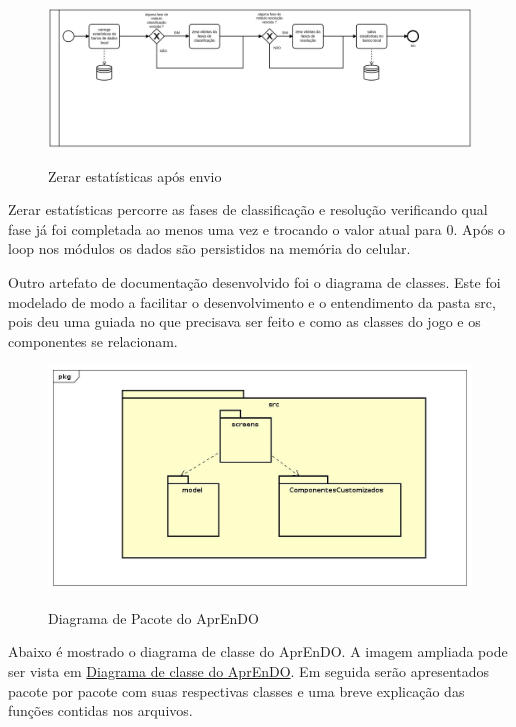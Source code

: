 \begin{figure}[H]
\centering
\caption{Zerar estatísticas após envio}
\includegraphics[width=\textwidth,height=\textheight,keepaspectratio]{figuras/processos/processo_zerar_estatisticas.png}
\label{zerar_estatisticas}
\end{figure}

Zerar estatísticas percorre as fases de classificação e resolução verificando qual fase já foi completada ao menos uma vez e trocando o valor atual para 0. Após o loop nos módulos os dados são persistidos na memória do celular.

Outro artefato de documentação desenvolvido foi o diagrama de classes. Este foi modelado de modo a facilitar o desenvolvimento e o entendimento da pasta src, pois deu uma guiada no que precisava ser feito e como as classes do jogo e os componentes se relacionam. 


\begin{figure}[H]
\caption{Diagrama de Pacote do AprEnDO}
\includegraphics[width=\textwidth,height=\textheight,keepaspectratio]{figuras/diagrama_pacote.jpg}
\label{fig:diagramaDePacote}
\end{figure}

Abaixo é mostrado o diagrama de classe do AprEnDO. A imagem ampliada pode ser vista em \href{https://github.com/LeonardoRk/TCC-2/wiki/Diagramas#diagrama-de-classe-do-aprendo}{Diagrama de classe do AprEnDO}. Em seguida serão apresentados pacote por pacote com suas respectivas classes e uma breve explicação das funções contidas nos arquivos.

